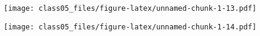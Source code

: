 \documentclass[]{article}
\newenvironment{Shaded}{\begin{snugshade}}{\end{snugshade}}
\newcommand{\KeywordTok}[1]{\textcolor[rgb]{0.13,0.29,0.53}{\textbf{#1}}}
\newcommand{\DecValTok}[1]{\textcolor[rgb]{0.00,0.00,0.81}{#1}}
\newcommand{\StringTok}[1]{\textcolor[rgb]{0.31,0.60,0.02}{#1}}
\newcommand{\OperatorTok}[1]{\textcolor[rgb]{0.81,0.36,0.00}{\textbf{#1}}}
\newcommand{\NormalTok}[1]{#1}
\begin{document}
\texttt{[image: class05\_files/figure-latex/unnamed-chunk-1-13.pdf]}

\begin{Shaded}
\end{Shaded}

\texttt{[image: class05\_files/figure-latex/unnamed-chunk-1-14.pdf]}
\end{document}
